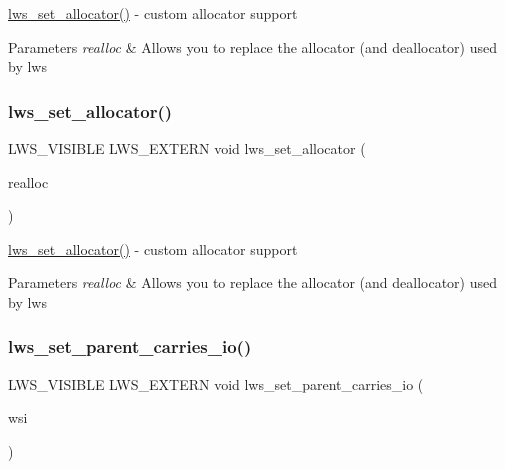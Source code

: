 \hyperlink{group__misc_gadb3f42965ee4c564fcd317ed95ee5604}{lws\+\_\+set\+\_\+allocator()} -\/ custom allocator support


\begin{DoxyParams}{Parameters}
{\em realloc} & Allows you to replace the allocator (and deallocator) used by lws \\
\hline
\end{DoxyParams}
\mbox{\label{group__misc_gadb3f42965ee4c564fcd317ed95ee5604}} 
\subsubsection{\texorpdfstring{lws\+\_\+set\+\_\+allocator()}{lws\_set\_allocator()}\hspace{0.1cm}{\footnotesize\ttfamily [2/2]}}
{\footnotesize\ttfamily L\+W\+S\+\_\+\+V\+I\+S\+I\+B\+LE L\+W\+S\+\_\+\+E\+X\+T\+E\+RN void lws\+\_\+set\+\_\+allocator (\begin{DoxyParamCaption}\item[{void $\ast$($\ast$)(void $\ast$ptr, size\+\_\+t size, const char $\ast$reason)}]{realloc }\end{DoxyParamCaption})}

\hyperlink{group__misc_gadb3f42965ee4c564fcd317ed95ee5604}{lws\+\_\+set\+\_\+allocator()} -\/ custom allocator support


\begin{DoxyParams}{Parameters}
{\em realloc} & Allows you to replace the allocator (and deallocator) used by lws \\
\hline
\end{DoxyParams}
\mbox{\label{group__misc_ga385fa63d2b574ba63a3436686e08c178}} 
\subsubsection{\texorpdfstring{lws\+\_\+set\+\_\+parent\+\_\+carries\+\_\+io()}{lws\_set\_parent\_carries\_io()}}
{\footnotesize\ttfamily L\+W\+S\+\_\+\+V\+I\+S\+I\+B\+LE L\+W\+S\+\_\+\+E\+X\+T\+E\+RN void lws\+\_\+set\+\_\+parent\+\_\+carries\+\_\+io (\begin{DoxyParamCaption}\item[{struct \hyperlink{structlws}{lws} $\ast$}]{wsi }\end{DoxyParamCaption})}

